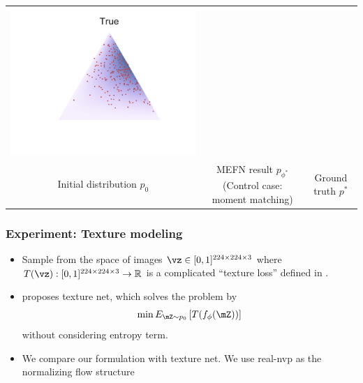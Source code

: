 \documentclass[16pt,presentation]{beamer}
\begin{document}
\begin{frame}
\begin{tabular}[t]{ccc}
\includegraphics[scale=0.3,clip = true, trim=1cm 1.5cm 1cm 1.5cm]{figs/MEFN/true_contours.pdf}\\
{\scriptsize Initial distribution $p_0$}& \parbox{0.3\textwidth}{\scriptsize MEFN result $p_{\phi^*}$ (Control case: moment matching)}&{\scriptsize Ground truth $p^*$}\\
\end{tabular}
\end{frame}

\begin{frame}
\frametitle{Experiment: Texture modeling}
\begin{itemize}
\item Sample from the space of images $\vz \in [0,1]^{224 \times 224 \times 3}$ where $T(\vz): [0,1]^{224 \times 224 \times 3} \rightarrow \mathbb{R}$ is a complicated ``texture loss'' defined in \textcite{ulyanov2016texture}.
\item \textcite{ulyanov2016texture} proposes texture net, which solves the problem by
\[\min E_{\mZ \sim p_0}\left[ T(f_\phi(\mZ)) \right] \]
without considering entropy term.
\item We compare our formulation with texture net. We use real-nvp \parencite{dinh2016density} as the normalizing flow structure
\end{itemize}
\end{frame}
\end{document}
